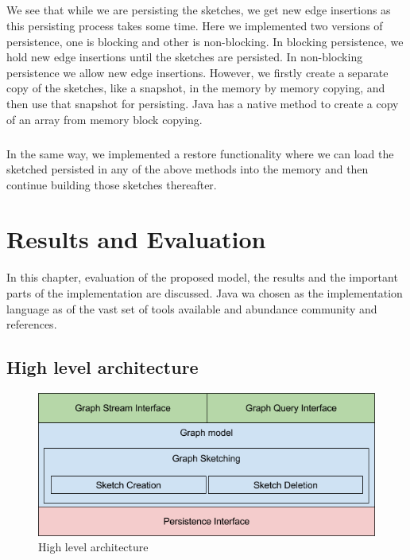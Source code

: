 \documentclass[12pt]{report}
\numberwithin{figure}{section}
\numberwithin{table}{section}
\begin{document}
\paragraph{}

We see that while we are persisting the sketches, we get new edge insertions as this persisting process takes some time. Here we implemented two versions of persistence, one is blocking and other is non-blocking. In blocking persistence, we hold new edge insertions until the sketches are persisted. In non-blocking persistence we allow new edge insertions. However, we firstly create a separate copy of the sketches, like a snapshot,  in the memory by memory copying, and then use that snapshot for persisting. Java has a native method to create a copy of an array from memory block copying. 

\paragraph{}

In the same way, we implemented a restore functionality where we can load the sketched persisted in any of the above methods into the memory and then continue building those sketches thereafter.

\chapter{Results and Evaluation}
In this chapter, evaluation of the proposed model, the results and the important parts of the implementation are discussed. Java wa chosen as the implementation language as of the vast set of tools available and abundance community and references.

\section{High level architecture}

\begin{figure}[H]
\centering
\includegraphics[scale=0.7]{images/image01}
\caption{High level architecture}
\end{figure}
\end{document}
